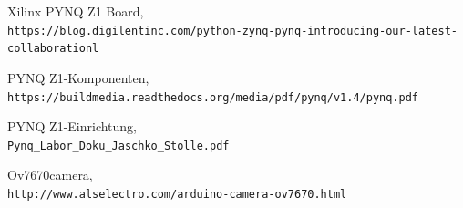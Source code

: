 \documentclass[a4paper]{report}
\begin{document}
\begin{thebibliography}{9}

Xilinx PYNQ Z1 Board,
\\\texttt{https://blog.digilentinc.com/python-zynq-pynq-introducing-our-latest-collaborationl}

PYNQ Z1-Komponenten,
\\\texttt{https://buildmedia.readthedocs.org/media/pdf/pynq/v1.4/pynq.pdf}

PYNQ Z1-Einrichtung,
\\\texttt{Pynq{\_}Labor{\_}Doku{\_}Jaschko{\_}Stolle.pdf}

Ov7670camera,
\\\texttt{http://www.alselectro.com/arduino-camera-ov7670.html}

\end{thebibliography}
\end{document}
